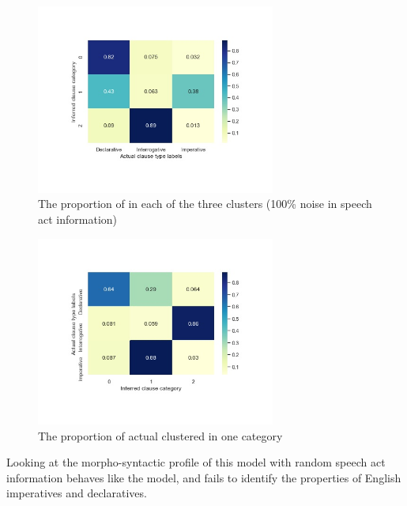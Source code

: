 \begin{figure}[H]
    \centering
    \includegraphics[width=0.7\textwidth]{figures/noisy100-heatmap.jpg}
    \caption{The proportion of \diis{} in each of the three clusters (100\% noise in speech act information) }
    \label{fig:noisy100-heatmap}
\end{figure}

\begin{figure}[H]
    \centering
    \includegraphics[width=0.7\textwidth]{figures/noisy100-heatrev.jpg}
    \caption{The proportion of actual \diis{} clustered in one category}
    \label{fig:noisy100-heatrev}
\end{figure}

Looking at the morpho-syntactic profile of this model with random speech act information behaves like the \dlearnerabbr{} model, and fails to identify the properties of English imperatives and declaratives.


